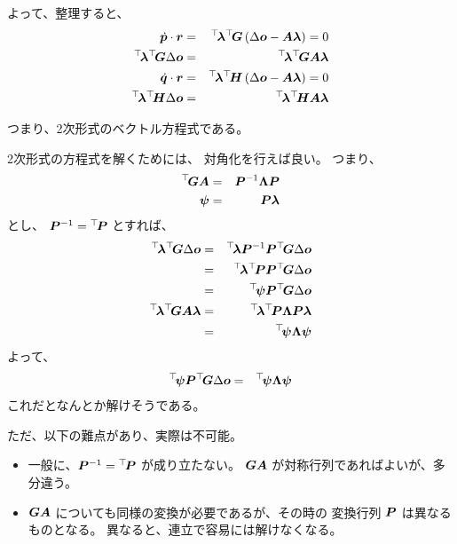 \documentclass[11pt,a4j]{jarticle}
\begin{document}
よって、整理すると、
  \begin{eqnarray}
    \dot{\V{p}} \cdot \V{r}
      & = &
        \Tr{\V{\lambda}}\Tr{\M{G}}
        \left( \Delta \V{o} - \M{A} \V{\lambda} \right) = 0
  \\
    \Tr{\V{\lambda}}\Tr{\M{G}}\Delta\V{o}
      & = &
        \Tr{\V{\lambda}}\Tr{\M{G}}\M{A}\V{\lambda}
  \\
    \dot{\V{q}} \cdot \V{r}
      & = &
        \Tr{\V{\lambda}}\Tr{\M{H}}
        \left( \Delta \V{o} - \M{A} \V{\lambda} \right) = 0
  \\
    \Tr{\V{\lambda}}\Tr{\M{H}}\Delta\V{o}
      & = &
        \Tr{\V{\lambda}}\Tr{\M{H}}\M{A}\V{\lambda}
  \end{eqnarray}

つまり、2次形式のベクトル方程式である。

2次形式の方程式を解くためには、
対角化を行えば良い。
つまり、
  \begin{eqnarray}
    {}^{\top}\!{{\bm{G} }} {\bm{A} }
      & = &
        {\bm{P} }^{-1} {\bm{\Lambda} } {\bm{P} }
  \\
    {\bm{\psi}}
      & = &
        {\bm{P} } {\bm{\lambda}}
  \end{eqnarray}
とし、
${\bm{P} }^{-1} = {}^{\top}\!{{\bm{P} }}$ とすれば、 
  \begin{eqnarray}
    \Tr{\V{\lambda}} \Tr{\M{G}} \Delta\V{o}
      & = &
        \Tr{\V{\lambda}} \M{P}^{-1} \M{P} \Tr{\M{G}} \Delta\V{o}
  \\
      & = &
        \Tr{\V{\lambda}} \Tr{\M{P}} \M{P} \Tr{\M{G}} \Delta\V{o}
  \\
      & = &
        \Tr{\V{\psi}} \M{P} \Tr{\M{G}} \Delta\V{o}
  \\
    \Tr{\V{\lambda}}\Tr{\M{G}}\M{A}\V{\lambda}
      & = &
        \Tr{\V{\lambda}}\Tr{\M{P}}\M{\Lambda}\M{P}\V{\lambda}
  \\
      & = &
        \Tr{\V{\psi}} \M{\Lambda} \V{\psi}
  \end{eqnarray}
よって、
  \begin{eqnarray}
    {}^{\top}\!{{\bm{\psi}}} {\bm{P} } {}^{\top}\!{{\bm{G} }} \Delta{\bm{o}}
      & = &
        {}^{\top}\!{{\bm{\psi}}} {\bm{\Lambda} } {\bm{\psi}}
  \end{eqnarray}
これだとなんとか解けそうである。

ただ、以下の難点があり、実際は不可能。
\begin{itemize}
  \item 一般に、${\bm{P} }^{-1} = {}^{\top}\!{{\bm{P} }}$ が成り立たない。
      ${\bm{G} }{\bm{A} }$ が対称行列であればよいが、多分違う。
  \item ${\bm{G} }{\bm{A} }$ についても同様の変換が必要であるが、その時の
    変換行列 ${\bm{P} }$ は異なるものとなる。
    異なると、連立で容易には解けなくなる。
\end{itemize}
\end{document}
